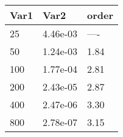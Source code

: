 \begin{tabular}{lll}
Var1 & Var2 & order \\ 
\hline 
25 & 4.46e-03 & ---- \\ 
50 & 1.24e-03 & 1.84 \\ 
100 & 1.77e-04 & 2.81 \\ 
200 & 2.43e-05 & 2.87 \\ 
400 & 2.47e-06 & 3.30 \\ 
800 & 2.78e-07 & 3.15 \\ 
\hline 
\end{tabular}